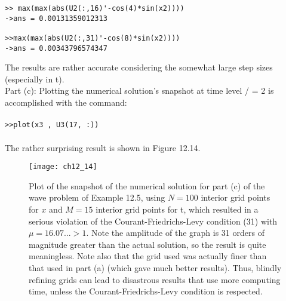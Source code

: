 \documentclass[../main.tex]{subfiles}
\begin{document}
\begin{lstlisting}[numbers=none,frame=none]
>> max(max(abs(U2(:,16)'-cos(4)*sin(x2)))) 
->ans = 0.00131359012313 

>>max(max(abs(U2(:,31)'-cos(8)*sin(x2)))) 
->ans = 0.00343796574347 
\end{lstlisting}
The results are rather accurate considering the somewhat large step sizes (especially in t).
\\
Part (c): Plotting the numerical solution's snapshot at time level / = 2 is accomplished with the command:
\\
\\
\texttt{>>plot(x3 , U3(17, :))}
\\
\\
The rather surprising result is shown in Figure 12.14.
\begin{figure}[H]
	\centering
	\texttt{[image: ch12\_14]}
	\caption{\textsf{Plot of the snapshot of the numerical solution for part (c) of the wave problem of Example 12.5, using $N= 100$ interior grid points for $x$ and $M= 15$ interior grid points for t, which resulted in a serious violation of the Courant-Friedrichs-Levy condition (31) with $\mu = 16.07... > 1$. Note the amplitude of the graph is 31 orders of magnitude greater than the actual solution, so the result is quite meaningless. Note also that the grid used was actually finer than that used in part (a) (which gave much better results). Thus, blindly refining grids can lead to disastrous results that use more computing time, unless the Courant-Friedrichs-Levy condition is respected.}}
	\label{pfig:ch12_14}
\end{figure}
\end{document}
